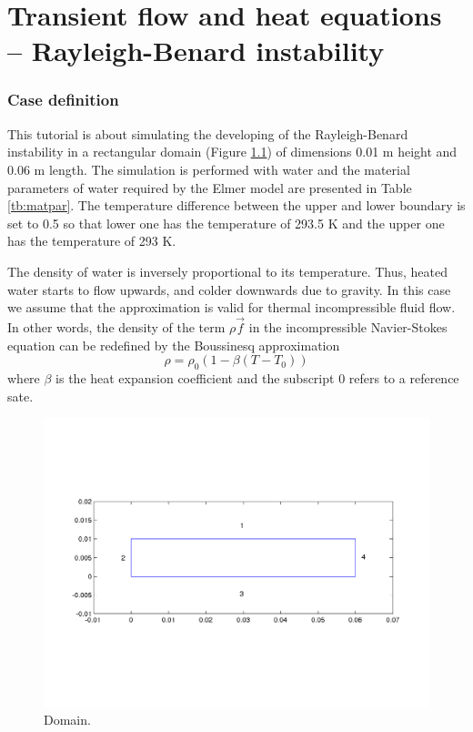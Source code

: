 \chapter{Transient flow and heat equations -- Rayleigh-Benard instability}


\subsection*{Case definition}

This tutorial is about simulating the developing of the
Rayleigh-Benard instability in a rectangular domain  (Figure
\ref{fg:rb_geometry}) of dimensions 0.01 m height and 0.06 m
length. The simulation is performed with water and the material
parameters of water required by the Elmer model are presented in Table \ref{tb:matpar}. The
temperature difference between the upper and lower boundary is set to
0.5 so that lower one has the temperature of  293.5 K and the upper
one has the temperature of 293 K.


The density of water is inversely proportional to its
temperature. Thus, heated water starts to flow upwards, and colder
downwards due to gravity.  In this case we assume that the
 approximation is valid for thermal incompressible
fluid flow. In other words, the density of the term $\rho$$\vec{f}$ in
the incompressible Navier-Stokes equation can be redefined by the
Boussinesq approximation
\begin{displaymath}
\rho = {\rho}_0(1-\beta(T-{T}_0))
\end{displaymath}
where $\beta$ is the heat expansion coefficient and the subscript 0 refers to a reference sate.


\begin{figure}[h]
\centering
\includegraphics[width=150 mm, height=55 mm]{rb_geometry}
\caption{Domain.}\label{fg:rb_geometry}
\end{figure}  


